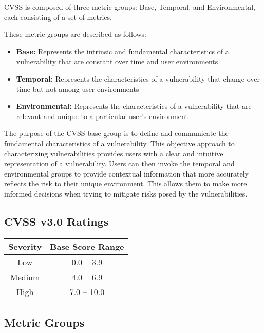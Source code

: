    CVSS is composed of three metric groups: Base, Temporal, and
    Environmental, each consisting of a set of metrics.

    These metric groups are described as follows:

    \begin{itemize}
      \item \textbf{Base:}
        Represents the intrinsic and fundamental characteristics of a
        vulnerability that are constant over time and user environments
      \item \textbf{Temporal:}
        Represents the characteristics of a vulnerability that change
        over time but not among user environments
      \item \textbf{Environmental:}
        Represents the characteristics of a vulnerability that
        are relevant and unique to a particular user's environment
    \end{itemize}

    The purpose of the CVSS base group is to define and communicate the
    fundamental characteristics of a vulnerability. This objective approach
    to characterizing vulnerabilities provides users with a clear and
    intuitive representation of a vulnerability. Users can then invoke the
    temporal and environmental groups to provide contextual information that
    more accurately reflects the risk to their unique environment. This
    allows them to make more informed decisions when trying to mitigate
    risks posed by the vulnerabilities.

    \subsection{CVSS v3.0 Ratings}\label{subsec:cvss-v3.0-ratings}

      \begin{center}
        \begin{tabularx}{0.4\textwidth}{c c}
          \toprule
          \textbf{Severity} & \textbf{Base Score Range} \\ \midrule
          Low    & 0.0 -- 3.9  \\ \midrule
          Medium & 4.0 -- 6.9  \\ \midrule
          High   & 7.0 -- 10.0 \\
          \bottomrule
        \end{tabularx}
      \end{center}

    \subsection{Metric Groups}\label{subsec:metric-groups}

